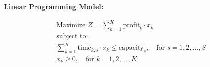 \documentclass{article}
\begin{document}
\textbf{Linear Programming Model:}

\begin{align*}
    & \text{Maximize } Z = \sum_{k=1}^{K} \text{profit}_{k} \cdot x_k \\
    & \text{subject to:} \\
    & \sum_{k=1}^{K} \text{time}_{k,s} \cdot x_k \leq \text{capacity}_{s}, \quad \text{for } s = 1, 2, \ldots, S \\
    & x_k \geq 0,\quad \text{for } k = 1, 2, \ldots, K
\end{align*}
\end{document}
